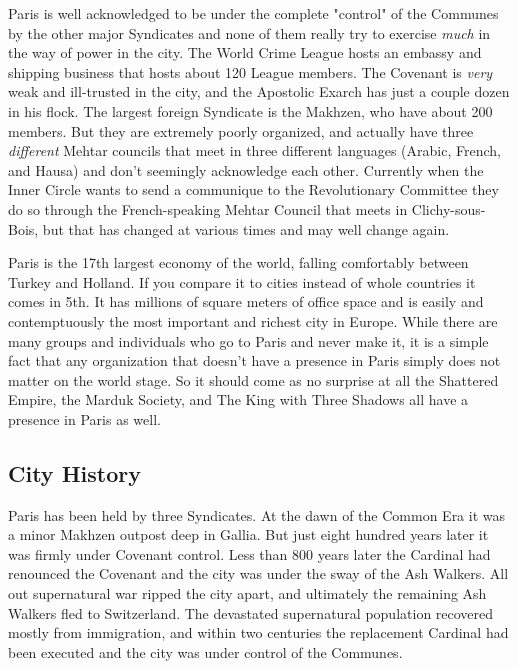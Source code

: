 Paris is well acknowledged to be under the complete "control" of the Communes by the other major Syndicates and none of them really try to exercise \textit{much} in the way of power in the city. The World Crime League hosts an embassy and shipping business that hosts about 120 League members. The Covenant is \textit{very} weak and ill-trusted in the city, and the Apostolic Exarch has just a couple dozen in his flock. The largest foreign Syndicate is the Makhzen, who have about 200 members. But they are extremely poorly organized, and actually have three \textit{different} Mehtar councils that meet in three different languages (Arabic, French, and Hausa) and don't seemingly acknowledge each other. Currently when the Inner Circle wants to send a communique to the Revolutionary Committee they do so through the French-speaking Mehtar Council that meets in Clichy-sous-Bois, but that has changed at various times and may well change again.

Paris is the 17th largest economy of the world, falling comfortably between Turkey and Holland. If you compare it to cities instead of whole countries it comes in 5th. It has millions of square meters of office space and is easily and contemptuously the most important and richest city in Europe. While there are many groups and individuals who go to Paris and never make it, it is a simple fact that any organization that doesn't have a presence in Paris simply does not matter on the world stage. So it should come as no surprise at all the Shattered Empire, the Marduk Society, and The King with Three Shadows all have a presence in Paris as well.

\subsection{City History}

\hspace{\parindent} Paris has been held by three Syndicates. At the dawn of the Common Era it was a minor Makhzen outpost deep in Gallia. But just eight hundred years later it was firmly under Covenant control. Less than 800 years later the Cardinal had renounced the Covenant and the city was under the sway of the Ash Walkers. All out supernatural war ripped the city apart, and ultimately the remaining Ash Walkers fled to Switzerland. The devastated supernatural population recovered mostly from immigration, and within two centuries the replacement Cardinal had been executed and the city was under control of the Communes. 

